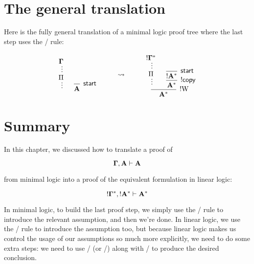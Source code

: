 \documentclass[../../../main.tex]{subfiles}
\begin{document}
\section{The general translation}

Here is the fully general translation of a minimal logic proof tree where the last step uses the \startrule/ rule:

$$
\begin{prooftree}
  \hypo{}
  \infer[no rule]1{\nd{\context/}}
  \ellipsis{}{\Proof/}
  \ellipsis{}{}
  \hypo{}
  \infer1[\startrule/]{\nd{A}}
  \infer[no rule]2{}
\end{prooftree}
\hskip 1cm \rightsquigarrow \hskip 1cm
\begin{prooftree}
  \hypo{}
  \infer[no rule]1{\bang/\nd{\context/}^{*}}
  \ellipsis{}{\Proof/}
  \ellipsis{}{}
  \hypo{}
  \infer1[\startrule/]{\bang/\nd{A}^{*}}
  \infer1[\bangCopy/]{\nd{A}^{*}}
  \infer2[\bangWeak/]{\nd{A}^{*}}
\end{prooftree}
$$



\section{Summary}

In this chapter, we discussed how to translate a proof of 

\begin{equation*}
\nd{\context/}, \nd{A} \ndturnstile/ \nd{A}
\end{equation*}

\noindent
from minimal logic into a proof of the equivalent formulation in linear logic: 

\begin{equation*}
\bang/\nd{\context/}^{*}, \bang/\nd{A}^{*} \ndturnstile/ \nd{A}^{*}
\end{equation*}

\noindent
In minimal logic, to build the last proof step, we simply use the \startrule/ rule to introduce the relevant assumption, and then we're done. In linear logic, we use the \startrule/ rule to introduce the assumption too, but because linear logic makes us control the usage of our assumptions so much more explicitly, we need to do some extra steps: we need to use \bangCopy/ (or \bangDer/) along with \bangWeak/ to produce the desired conclusion.
\end{document}

